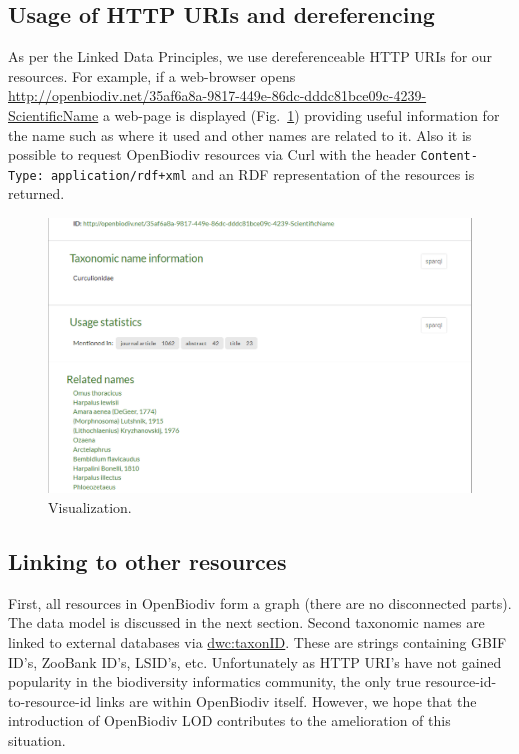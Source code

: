 \subsection{Usage of HTTP URIs and dereferencing}

As per the Linked Data Principles, we use dereferenceable HTTP URIs for our resources. For example, if a web-browser opens\\\url{http://openbiodiv.net/35af6a8a-9817-449e-86dc-dddc81bce09c-4239-ScientificName} a web-page is displayed (Fig.~\ref{fig:portal-name-visualization}) providing useful information for the name such as where it used and other names are related to it. Also it is possible to request OpenBiodiv resources via Curl with the header {\tt Content-Type: application/rdf+xml} and an RDF representation of the resources is returned.

\begin{figure}
\centering
\includegraphics[width=\textwidth]{Figures/portal-name-visualization}
\decoRule
\caption{Visualization.}
\label{fig:portal-name-visualization}
\end{figure}

\subsection{Linking to other resources}

First, all resources in OpenBiodiv form a graph (there are no disconnected parts). The data model is discussed in the next section. Second taxonomic names are linked to external databases via \url{dwc:taxonID}. These are strings containing GBIF ID's, ZooBank ID's, LSID's, etc. Unfortunately as HTTP URI's have not gained popularity in the biodiversity informatics community, the only true resource-id-to-resource-id links are within OpenBiodiv itself. However, we hope that the introduction of OpenBiodiv LOD contributes to the amelioration of this situation.

